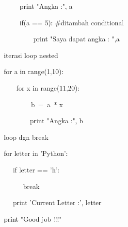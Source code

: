 ~~~~ print "Angka :", a \par
~~~~ if(a == 5):  $  \#  $ditambah conditional \par
~~~~~~~~ print "Saya dapat angka : ",a \par
\vspace{12pt}
iterasi loop nested \par
for a in range(1,10): \par
~~~ for x in range(11,20): \par
~~~~~~~~b~=~a~* x      \par
~~~~~~~ print "Angka :", b \par
\vspace{12pt}
loop dgn break \par
for letter in 'Python': \par
~~ if letter == 'h': \par
~~~~~ break \par
~~ print 'Current Letter :', letter \par
\vspace{12pt}
print "Good job !!!" \par
\vspace{12pt}
